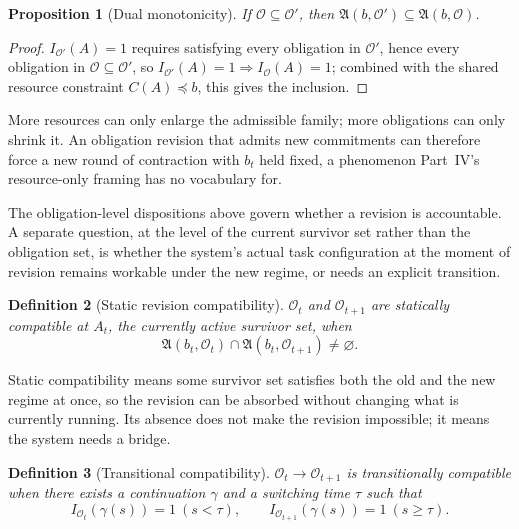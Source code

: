 \documentclass[11pt]{report}
\newtheorem{definition}{Definition}[chapter]
\newtheorem{proposition}[definition]{Proposition}
\begin{document}
\begin{proposition}[Dual monotonicity]
If $\mathcal O \subseteq \mathcal O'$, then $\mathfrak A(b, \mathcal O') \subseteq \mathfrak A(b, \mathcal O)$.
\end{proposition}
\begin{proof}
$I_{\mathcal O'}(A) = 1$ requires satisfying every obligation in $\mathcal O'$, hence every obligation in $\mathcal O \subseteq \mathcal O'$, so $I_{\mathcal O'}(A) = 1 \Rightarrow I_{\mathcal O}(A) = 1$; combined with the shared resource constraint $C(A) \preceq b$, this gives the inclusion.
\end{proof}

More resources can only enlarge the admissible family; more obligations can only shrink it. An obligation revision that admits new commitments can therefore force a new round of contraction with $b_t$ held fixed, a phenomenon Part~IV's resource-only framing has no vocabulary for.

The obligation-level dispositions above govern whether a revision is accountable. A separate question, at the level of the current survivor set rather than the obligation set, is whether the system's actual task configuration at the moment of revision remains workable under the new regime, or needs an explicit transition.

\begin{definition}[Static revision compatibility]
$\mathcal O_t$ and $\mathcal O_{t+1}$ are statically compatible at $A_t$, the currently active survivor set, when
\[
\mathfrak A(b_t, \mathcal O_t) \cap \mathfrak A(b_t, \mathcal O_{t+1}) \ne \varnothing.
\]
\end{definition}

Static compatibility means some survivor set satisfies both the old and the new regime at once, so the revision can be absorbed without changing what is currently running. Its absence does not make the revision impossible; it means the system needs a bridge.

\begin{definition}[Transitional compatibility]
$\mathcal O_t \to \mathcal O_{t+1}$ is transitionally compatible when there exists a continuation $\gamma$ and a switching time $\tau$ such that
\[
I_{\mathcal O_t}(\gamma(s)) = 1 \ (s < \tau), \qquad I_{\mathcal O_{t+1}}(\gamma(s)) = 1 \ (s \ge \tau).
\]
\end{definition}
\end{document}

